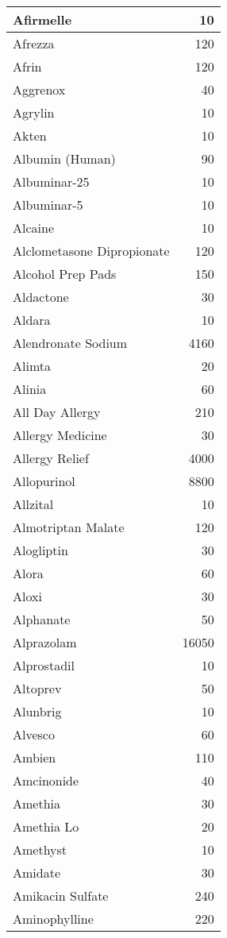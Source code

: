 \documentclass[
]{article}
\begin{document}
\begin{table}
\begin{tabular}[t]{l|r}
\hline
Afirmelle & 10\\
\hline
Afrezza & 120\\
\hline
Afrin & 120\\
\hline
Aggrenox & 40\\
\hline
Agrylin & 10\\
\hline
Akten & 10\\
\hline
Albumin (Human) & 90\\
\hline
Albuminar-25 & 10\\
\hline
Albuminar-5 & 10\\
\hline
Alcaine & 10\\
\hline
Alclometasone Dipropionate & 120\\
\hline
Alcohol Prep Pads & 150\\
\hline
Aldactone & 30\\
\hline
Aldara & 10\\
\hline
Alendronate Sodium & 4160\\
\hline
Alimta & 20\\
\hline
Alinia & 60\\
\hline
All Day Allergy & 210\\
\hline
Allergy Medicine & 30\\
\hline
Allergy Relief & 4000\\
\hline
Allopurinol & 8800\\
\hline
Allzital & 10\\
\hline
Almotriptan Malate & 120\\
\hline
Alogliptin & 30\\
\hline
Alora & 60\\
\hline
Aloxi & 30\\
\hline
Alphanate & 50\\
\hline
Alprazolam & 16050\\
\hline
Alprostadil & 10\\
\hline
Altoprev & 50\\
\hline
Alunbrig & 10\\
\hline
Alvesco & 60\\
\hline
Ambien & 110\\
\hline
Amcinonide & 40\\
\hline
Amethia & 30\\
\hline
Amethia Lo & 20\\
\hline
Amethyst & 10\\
\hline
Amidate & 30\\
\hline
Amikacin Sulfate & 240\\
\hline
Aminophylline & 220\\

\end{tabular}
\end{table}
\end{document}
